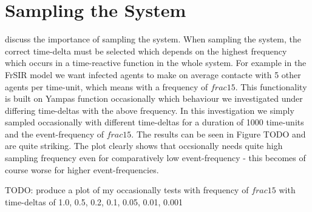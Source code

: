 \section{Sampling the System}
discuss the importance of sampling the system. When sampling the system, the correct time-delta must be selected which depends on the highest frequency which occurs in a time-reactive function in the whole system. For example in the FrSIR model we want infected agents to make on average contacte with 5 other agents per time-unit, which means with a frequency of $frac{1}{5}$. This functionality is built on Yampas function occasionally which behaviour we investigated under differing time-deltas with the above frequency. In this investigation we simply sampled occasionally with different time-deltas for a duration of 1000 time-units and the event-frequency of $frac{1}{5}$. The results can be seen in Figure TODO and are quite striking. The plot clearly shows that occsionally needs quite high sampling frequency even for comparatively low event-frequency - this becomes of course worse for higher event-frequencies.

TODO: produce a plot of my occasionally tests with frequency of $frac{1}{5}$ with time-deltas of 1.0, 0.5, 0.2, 0.1, 0.05, 0.01, 0.001

